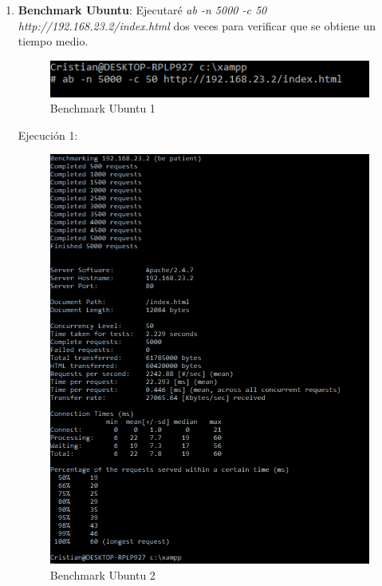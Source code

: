 \begin{enumerate}
	\item \textbf{Benchmark Ubuntu}:
		Ejecutaré \textit{ab -n 5000 -c 50 http://192.168.23.2/index.html} dos veces para verificar que se obtiene un tiempo medio.
		
		\begin{figure}[H] %
			\centering
				\includegraphics[scale=0.4]{pics/xamppUbu1}  %
			\caption{Benchmark Ubuntu 1} \label{fig:ubu1}
		\end{figure}
	
		Ejecución 1:
		
		\begin{figure}[H] %
			\centering
			\includegraphics[scale=0.4]{pics/xamppUbu2}  %
			\caption{Benchmark Ubuntu 2} \label{fig:ubu2}
		\end{figure}
	

\end{enumerate}
